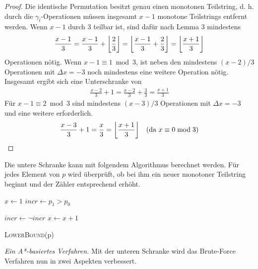 \documentclass[a4paper, 11pt, ngerman]{article}
\begin{document}
\begin{proof}
    Die identische Permutation besitzt genau einen monotonen Teilstring, d. h. durch die $\gamma_i$-Operationen müssen insgesamt $x - 1$ monotone Teilstrings entfernt werden. Wenn $x - 1$ durch 3 teilbar ist, sind dafür nach Lemma 3 mindestens
    \begin{align*}
        \frac {x - 1} 3 = \frac {x - 1} 3 + \bigg{\lfloor} \frac 2 3 \bigg{\rfloor}
        = \bigg{\lfloor} \frac {x - 1} 3 + \frac 2 3 \bigg{\rfloor} =
        \bigg{\lfloor} \frac {x + 1} 3 \bigg{\rfloor}
    \end{align*}
    Operationen nötig. Wenn $x - 1 \equiv 1 \bmod 3$, ist neben den mindestens $(x - 2)/3$ Operationen mit $\Delta x = -3$ noch mindestens eine weitere Operation nötig. Insgesamt ergibt sich eine Unterschranke von
    \begin{align*}
        \frac {x - 2} 3 + 1 = \frac {x - 2} 3 + \frac 3 3 = \frac {x + 1} 3
    \end{align*}
    Für $x - 1 \equiv 2 \bmod 3$ sind mindestens $(x - 3) / 3$ Operationen mit $\Delta x = -3$ und eine weitere erforderlich.
    \begin{align*}
        \frac {x - 3} 3 + 1 = \frac x 3 = \bigg{\lfloor} \frac {x + 1} 3 \bigg{\rfloor} \quad (\text{da } x \equiv 0 \bmod 3)
    \end{align*}
\end{proof}

Die untere Schranke kann mit folgendem Algorithmus berechnet werden. Für jedes Element von $p$ wird überprüft, ob bei ihm ein neuer monotoner Teilstring beginnt und der Zähler entsprechend erhöht.

\begin{algorithm}
    {
         \;
    }

    $x \gets 1$ \;
    $incr \gets p_1 > p_0$ \;

    {
        {
            $incr \gets \neg incr$ \;
            $x \gets x + 1$ \;
        }
    }

     \;

    \caption{\textsc{LowerBound}(p)}
\end{algorithm}

\noindent \emph{Ein A*-basiertes Verfahren.} Mit der unteren Schranke wird das Brute-Force Verfahren nun in zwei Aspekten verbessert.
\end{document}
